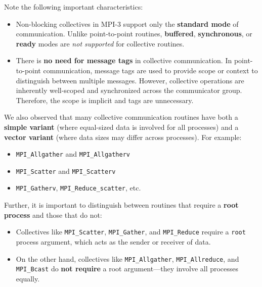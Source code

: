 \documentclass[12pt]{book}
\begin{document}
Note the following important characteristics:
\begin{itemize}
    \item Non-blocking collectives in MPI-3 support only the \textbf{standard mode} of communication. Unlike point-to-point routines, \textbf{buffered}, \textbf{synchronous}, or \textbf{ready} modes are \textit{not supported} for collective routines.
    \item There is \textbf{no need for message tags} in collective communication. In point-to-point communication, message tags are used to provide scope or context to distinguish between multiple messages. However, collective operations are inherently well-scoped and synchronized across the communicator group. Therefore, the scope is implicit and tags are unnecessary.
\end{itemize}

\vspace{1em}

We also observed that many collective communication routines have both a \textbf{simple variant} (where equal-sized data is involved for all processes) and a \textbf{vector variant} (where data sizes may differ across processes). For example:
\begin{itemize}
    \item \texttt{MPI\_Allgather} and \texttt{MPI\_Allgatherv}
    \item \texttt{MPI\_Scatter} and \texttt{MPI\_Scatterv}
    \item \texttt{MPI\_Gatherv}, \texttt{MPI\_Reduce\_scatter}, etc.
\end{itemize}

Further, it is important to distinguish between routines that require a \textbf{root process} and those that do not:
\begin{itemize}
    \item Collectives like \texttt{MPI\_Scatter}, \texttt{MPI\_Gather}, and \texttt{MPI\_Reduce} require a \texttt{root} process argument, which acts as the sender or receiver of data.
    \item On the other hand, collectives like \texttt{MPI\_Allgather}, \texttt{MPI\_Allreduce}, and \texttt{MPI\_Bcast} do \textbf{not require} a root argument—they involve all processes equally.
\end{itemize}

\vspace{1em}
\end{document}
